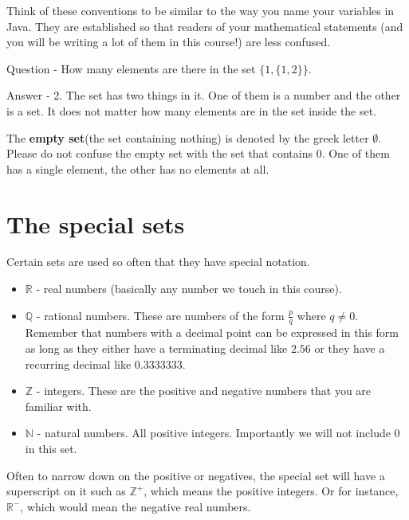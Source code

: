 \documentclass[12pt]{article}
\begin{document}
Think of these conventions to be similar to the way you name your variables in Java. They are established so that readers of your mathematical statements (and you will be writing a lot of them in this course!) are less confused.

\medskip

Question - How many elements are there in the set $\{1, \{1,2\}\}$. 

Answer - 2. The set has two things in it. One of them is a number and the other is a set. It does not matter how many elements are in the set inside the set.

\medskip

The {\bf empty set}(the set containing nothing) is denoted by the greek letter $\emptyset$. Please do not confuse the empty set with the set that contains $0$. One of them has a single element, the other has no elements at all.

\section*{The special sets}

Certain sets are used so often that they have special notation.

\begin{itemize}
\item $\mathbb{R}$ - real numbers (basically any number we touch in this course). 

\item $\mathbb{Q}$ - rational numbers. These are numbers of the form $\frac{p}{q}$ where $q \neq 0 $. Remember that numbers with a decimal point can be expressed in this form as long as they either have a terminating decimal like 
$2.56$ or they have a recurring decimal like $0.3333333$.

\item $\mathbb{Z}$ - integers. These are the positive and negative numbers that you are familiar with. 

\item $\mathbb{N}$ - natural numbers. All positive integers. Importantly we will not include 0 in this set. 

\end{itemize}

Often to narrow down on the positive or negatives, the special set will have a superscript on it such as $\mathbb{Z}^+$, which means the positive integers.
Or for instance, $\mathbb{R}^-$, which would mean the negative real numbers.
\end{document}

